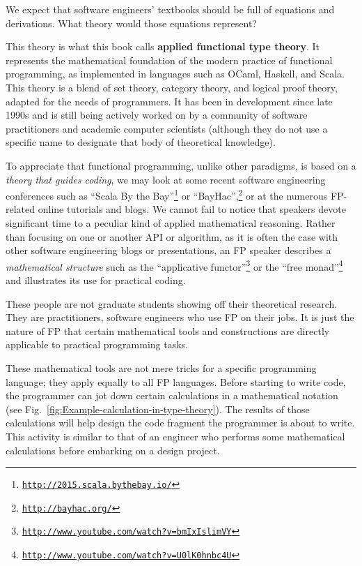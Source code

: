 We expect that software engineers\textsf{'} textbooks should be full
of equations and derivations. What theory would those equations represent?

This theory is what this book calls \textbf{applied functional type
theory}. It represents the
mathematical foundation of the modern practice of functional programming,
as implemented in languages such as OCaml, Haskell, and Scala. This
theory is a blend of set theory, category theory, and logical proof
theory, adapted for the needs of programmers. It has been in development
since late 1990s and is still being actively worked on by a community
of software practitioners and academic computer scientists (although
they do not use a specific name to designate that body of theoretical
knowledge).

To appreciate that functional programming, unlike other paradigms,
is based on a \emph{theory that guides coding}, we may look at some
recent software engineering conferences such as \textsf{``}Scala By the Bay\textsf{''}\footnote{\texttt{\href{http://2015.scala.bythebay.io/}{http://2015.scala.bythebay.io/}}}
or \textsf{``}BayHac\textsf{''},\footnote{\texttt{\href{http://bayhac.org/}{http://bayhac.org/}}}
or at the numerous FP-related online tutorials and blogs. We cannot
fail to notice that speakers devote significant time to a peculiar
kind of applied mathematical reasoning. Rather than focusing on one
or another API or algorithm, as it is often the case with other software
engineering blogs or presentations, an FP speaker describes a \emph{mathematical
structure} \textemdash{} such as the \textsf{``}applicative functor\textsf{''}\footnote{\texttt{\href{http://www.youtube.com/watch?v=bmIxIslimVY}{http://www.youtube.com/watch?v=bmIxIslimVY}}}
or the \textsf{``}free monad\textsf{''}\footnote{\texttt{\href{http://www.youtube.com/watch?v=U0lK0hnbc4U}{http://www.youtube.com/watch?v=U0lK0hnbc4U}}}
\textemdash{} and illustrates its use for practical coding.

These people are not graduate students showing off their theoretical
research. They are practitioners, software engineers who use FP on
their jobs. It is just the nature of FP that certain mathematical
tools and constructions are directly applicable to practical programming
tasks.

These mathematical tools are not mere tricks for a specific programming
language; they apply equally to all FP languages. Before starting
to write code, the programmer can jot down certain calculations in
a mathematical notation (see Fig.\ \ref{fig:Example-calculation-in-type-theory}).
The results of those calculations will help design the code fragment
the programmer is about to write. This activity is similar to that
of an engineer who performs some mathematical calculations before
embarking on a design project. 

